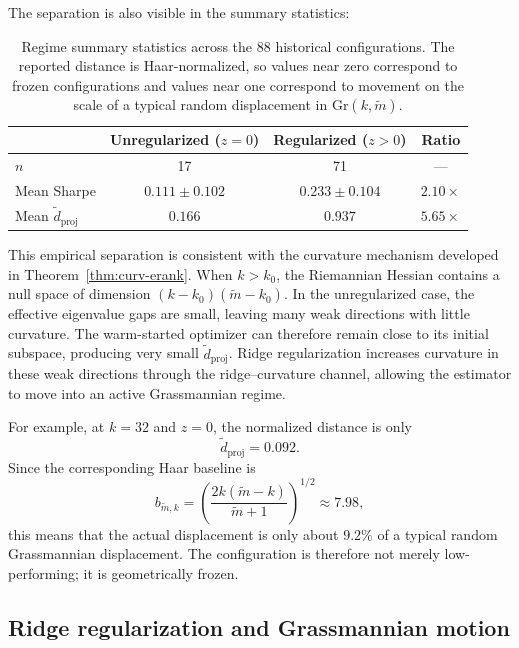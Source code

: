 \documentclass[11pt,letterpaper]{article}
\newcommand{\gr}{\mathrm{Gr}}
\begin{document}
The separation is also visible in the summary statistics:
\begin{table}[H]
	\centering
	\small
	\begin{tabular}{lccc}
		\toprule
		& \textcolor{illred}{\textbf{Unregularized} ($z=0$)}
		& \textcolor{virtblue}{\textbf{Regularized} ($z>0$)}
		& Ratio \\
		\midrule
		$n$
		& 17
		& 71
		& --- \\
		Mean Sharpe
		& $0.111 \pm 0.102$
		& $0.233 \pm 0.104$
		& $2.10\times$ \\
		Mean $\widetilde d_{\mathrm{proj}}$
		& $0.166$
		& $0.937$
		& $\mathbf{5.65\times}$ \\
		\bottomrule
	\end{tabular}
	\caption{Regime summary statistics across the 88 historical configurations.
		The reported distance is Haar-normalized, so values near zero correspond to
		frozen configurations and values near one correspond to movement on the
		scale of a typical random displacement in $\gr(k,\tilde m)$.}
	\label{tab:regime-summary}
\end{table}

This empirical separation is consistent with the curvature mechanism developed
in Theorem~\ref{thm:curv-erank}. When $k>k_0$, the Riemannian Hessian contains
a null space of dimension $(k-k_0)(\tilde m-k_0)$. In the unregularized case, the
effective eigenvalue gaps are small, leaving many weak directions with little
curvature. The warm-started optimizer can therefore remain close to its initial
subspace, producing very small $\widetilde d_{\mathrm{proj}}$. Ridge
regularization increases curvature in these weak directions through the
ridge--curvature channel, allowing the estimator to move into an active
Grassmannian regime.

For example, at $k=32$ and $z=0$, the normalized distance is only
\begin{equation*}
\widetilde d_{\mathrm{proj}} = 0.092.
\end{equation*}
Since the corresponding Haar baseline is
\begin{equation*}
b_{\tilde m,k}
=
\left(\frac{2k(\tilde m-k)}{\tilde m+1}\right)^{1/2}
\approx 7.98,
\end{equation*}
this means that the actual displacement is only about $9.2\%$ of a typical
random Grassmannian displacement. The configuration is therefore not merely
low-performing; it is geometrically frozen.

\subsection{\texorpdfstring{Ridge regularization and Grassmannian motion}{Ridge regularization and Grassmannian motion}}
\label{sec:zsweep}
\end{document}
